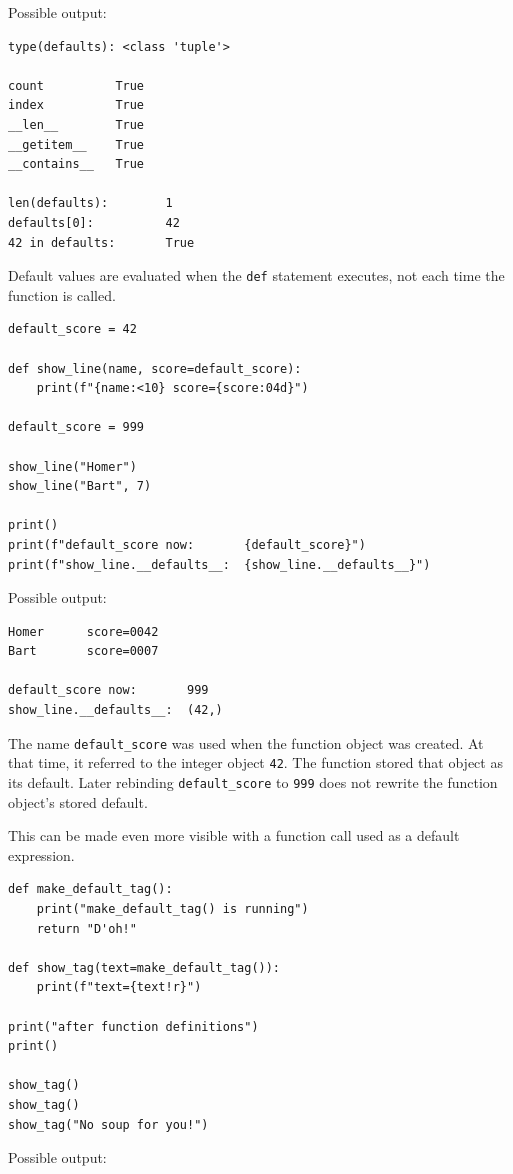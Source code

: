 Possible output:

\begin{verbatim}
type(defaults): <class 'tuple'>

count          True
index          True
__len__        True
__getitem__    True
__contains__   True

len(defaults):        1
defaults[0]:          42
42 in defaults:       True
\end{verbatim}

Default values are evaluated when the \texttt{def} statement executes, not each time the function is called.

\begin{verbatim}
default_score = 42

def show_line(name, score=default_score):
    print(f"{name:<10} score={score:04d}")

default_score = 999

show_line("Homer")
show_line("Bart", 7)

print()
print(f"default_score now:       {default_score}")
print(f"show_line.__defaults__:  {show_line.__defaults__}")
\end{verbatim}

Possible output:

\begin{verbatim}
Homer      score=0042
Bart       score=0007

default_score now:       999
show_line.__defaults__:  (42,)
\end{verbatim}

The name \texttt{default\_score} was used when the function object was created. At that time, it referred to the integer object \texttt{42}. The function stored that object as its default. Later rebinding \texttt{default\_score} to \texttt{999} does not rewrite the function object's stored default.

This can be made even more visible with a function call used as a default expression.

\begin{verbatim}
def make_default_tag():
    print("make_default_tag() is running")
    return "D'oh!"

def show_tag(text=make_default_tag()):
    print(f"text={text!r}")

print("after function definitions")
print()

show_tag()
show_tag()
show_tag("No soup for you!")
\end{verbatim}

Possible output:

